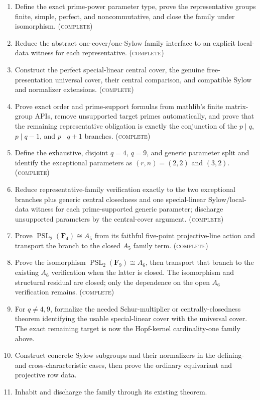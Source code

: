 \documentclass[11pt]{article}
\newcommand{\done}{\textcolor{donegreen}{\textsc{complete}}}
\begin{document}
\begin{enumerate}[label=\textbf{P3.PSL2.\arabic*.},leftmargin=*]
  \item Define the exact prime-power parameter type, prove the
  representative groups finite, simple, perfect, and noncommutative, and
  close the family under isomorphism.  (\done)
  \item Reduce the abstract one-cover/one-Sylow family interface to an
  explicit local-data witness for each representative.  (\done)
  \item Construct the perfect special-linear central cover, the
  genuine free-presentation universal cover, their central comparison, and
  compatible Sylow and normalizer extensions.  (\done)
  \item Prove exact order and prime-support formulas from mathlib's finite
  matrix-group APIs, remove unsupported target primes automatically, and
  prove that the remaining representative obligation is exactly the
  conjunction of the \(p\mid q\), \(p\mid q-1\), and \(p\mid q+1\)
  branches.  (\done)
  \item Define the exhaustive, disjoint \(q=4\), \(q=9\), and generic
  parameter split and identify the exceptional parameters as
  \((r,n)=(2,2)\) and \((3,2)\).  (\done)
  \item Reduce representative-family verification exactly to the two
  exceptional branches plus generic central closedness and one
  special-linear Sylow/local-data witness for each prime-supported generic
  parameter; discharge unsupported parameters by the central-cover
  argument.  (\done)
  \item Prove
  \(\operatorname{PSL}_2(\mathbf F_4)\cong A_5\) from its faithful
  five-point projective-line action and transport the branch to the closed
  \(A_5\) family term.  (\done)
  \item Prove the isomorphism
  \(\operatorname{PSL}_2(\mathbf F_9)\cong A_6\), then transport that
  branch to the existing \(A_6\) verification when the latter is closed.
  The isomorphism and structural residual are closed; only the dependence
  on the open \(A_6\) verification remains.  (\done)
  \item For \(q\ne4,9\), formalize the needed Schur-multiplier or
  centrally-closedness theorem identifying the usable special-linear
  cover with the universal cover.  The exact remaining target is now the
  Hopf-kernel cardinality-one family above.
  \item Construct concrete Sylow subgroups and their normalizers in the
  defining- and cross-characteristic cases, then prove the ordinary
  equivariant and projective row data.
  \item Inhabit
   and
  discharge the family through its existing  theorem.
\end{enumerate}
\end{document}
